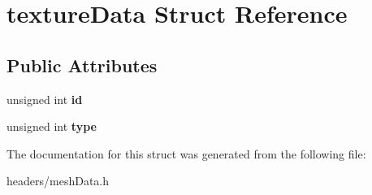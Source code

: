 \hypertarget{structtexture_data}{\section{texture\+Data Struct Reference}
\label{structtexture_data}
}
\subsection*{Public Attributes}
\begin{DoxyCompactItemize}
\item 
\hypertarget{structtexture_data_a1abdf567c9dfd997e20cd5a2cd6c963c}{unsigned int {\bfseries id}}\label{structtexture_data_a1abdf567c9dfd997e20cd5a2cd6c963c}

\item 
\hypertarget{structtexture_data_ac6d88c52ef23e15e972495ca7c9554bc}{unsigned int {\bfseries type}}\label{structtexture_data_ac6d88c52ef23e15e972495ca7c9554bc}

\end{DoxyCompactItemize}


The documentation for this struct was generated from the following file\+:\begin{DoxyCompactItemize}
\item 
headers/mesh\+Data.\+h\end{DoxyCompactItemize}
